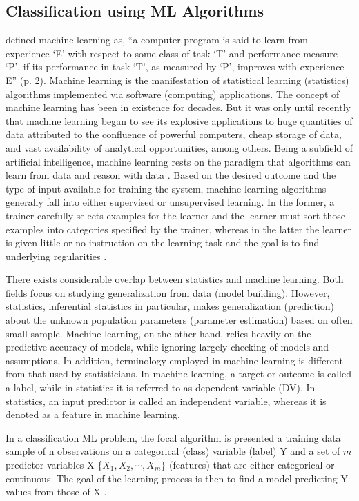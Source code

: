 \documentclass[deca,nonblindrev]{informs3} %
\begin{document}
\subsection{Classification using ML Algorithms}

\cite{mitchell1997machine}  defined machine learning as, ``a  computer program is said to learn from experience ‘E’ with respect to some class of task ‘T’ and performance measure ‘P’, if its performance in task ‘T’, as measured by ‘P’, improves with experience E'' (p. 2). Machine learning is the manifestation of statistical learning (statistics) algorithms implemented via software (computing) applications. The concept of machine learning has been in existence for decades. But it was only until recently that machine learning began to see its explosive applications to huge quantities of data attributed to the confluence of powerful computers, cheap storage of data, and vast availability of analytical opportunities, among others. Being a subfield of artificial intelligence, machine learning rests on the paradigm that algorithms can learn from data and reason with data \citep{rao2013handbook}. Based on the desired outcome and the type of input available for training the system, machine learning algorithms generally fall into either supervised or unsupervised learning.  In the former, a trainer carefully selects examples for the learner and the learner must sort those examples into categories specified by the trainer, whereas in the latter the learner is given little or no instruction on the learning task and the goal is to find underlying regularities \citep{cottrell2006new}.

There exists considerable overlap between statistics and machine learning. Both fields focus on studying generalization from data (model building). However, statistics, inferential statistics in particular, makes generalization (prediction) about the unknown population parameters (parameter estimation) based on often small sample. Machine learning, on the other hand, relies heavily on the predictive accuracy of models, while ignoring largely checking of models and assumptions. In addition, terminology employed in machine learning is different from that used by statisticians. In machine learning, a target or outcome is called a label, while in statistics it is referred to as dependent variable (DV). In statistics, an input predictor is called an independent variable, whereas it is denoted as a feature in machine learning.  

In a classification ML problem, the focal algorithm  is  presented  a training data sample of n observations on a categorical (class) variable (label) Y and a set of $m$ predictor variables X \{$X_1, X_2, \cdots, X_m\}$  (features) that are either categorical or continuous. The goal of the learning process is then  to find a model predicting Y values from those of X \citep{Loh2011}.
\end{document}

